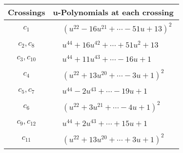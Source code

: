 \documentclass[1p]{elsarticle_modified}
\theoremstyle{definition}
\begin{document}
\begin{tabular}{m{50pt}|m{274pt}}
Crossings & \hspace{64pt}u-Polynomials at each crossing \\
\hline $$\begin{aligned}c_{1}\end{aligned}$$&$\begin{aligned}
&(u^{22}-16 u^{21}+\cdots-51 u+13)^{2}
\end{aligned}$\\
\hline $$\begin{aligned}c_{2},c_{8}\end{aligned}$$&$\begin{aligned}
&u^{44}+16 u^{42}+\cdots+51 u^2+13
\end{aligned}$\\
\hline $$\begin{aligned}c_{3},c_{10}\end{aligned}$$&$\begin{aligned}
&u^{44}+11 u^{43}+\cdots-16 u+1
\end{aligned}$\\
\hline $$\begin{aligned}c_{4}\end{aligned}$$&$\begin{aligned}
&(u^{22}+13 u^{20}+\cdots-3 u+1)^{2}
\end{aligned}$\\
\hline $$\begin{aligned}c_{5},c_{7}\end{aligned}$$&$\begin{aligned}
&u^{44}-2 u^{43}+\cdots-19 u+1
\end{aligned}$\\
\hline $$\begin{aligned}c_{6}\end{aligned}$$&$\begin{aligned}
&(u^{22}+3 u^{21}+\cdots-4 u+1)^{2}
\end{aligned}$\\
\hline $$\begin{aligned}c_{9},c_{12}\end{aligned}$$&$\begin{aligned}
&u^{44}+2 u^{43}+\cdots+15 u+1
\end{aligned}$\\
\hline $$\begin{aligned}c_{11}\end{aligned}$$&$\begin{aligned}
&(u^{22}+13 u^{20}+\cdots+3 u+1)^{2}
\end{aligned}$\\
\hline
\end{tabular}\\~\\
\end{document}

